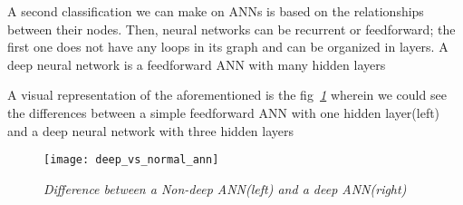 A second classification we can make on ANNs is based on the relationships between their nodes.
Then, neural networks can be recurrent or feedforward;
the first one does not have any loops in its graph and can be organized in layers.
A deep neural network is a feedforward ANN with many hidden layers
\vspace{5cm}

A visual representation of the aforementioned is the fig\emph{~\ref{fig:deep_vs_normal}} wherein we could see
the differences between a simple feedforward ANN with one hidden layer(left) and a deep neural network with three
hidden layers
\begin{figure}[h]
    \centering
    \texttt{[image: deep\_vs\_normal\_ann]}
    \caption{\emph{Difference between a Non-deep ANN(left) and a deep ANN(right) \cite{deepLearningBook}}}
    \label{fig:deep_vs_normal}
\end{figure}

